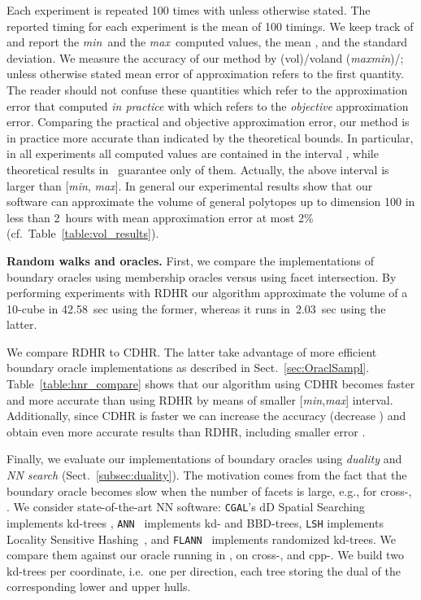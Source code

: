 \documentclass[11pt,a4paper]{article}
\def\vol{\mbox{vol}}
\def\vol{\mbox{vol}}
\def\Min{{\it min}}
\def\Max{{\it max}}
\begin{document}
Each experiment is repeated 100 times with  unless otherwise stated. 
The reported timing for each experiment is the mean of 100 timings. 
We keep track of and report the \Min\ and the \Max\ computed values,
the mean , and the standard deviation.  We measure the accuracy of our method by (\vol)/\vol and (\Max\Min)/; unless otherwise stated mean error of approximation refers to the first quantity. 
The reader should not confuse these quantities which refer to the approximation error that computed {\it in practice} with  which refers to the {\it objective} approximation error.
Comparing the practical and objective approximation error, our method is in practice more accurate than indicated by the theoretical bounds.
In particular, in all experiments all computed values are contained in the
interval ,
while theoretical results in~\cite{KannanLS97} guarantee only  of them.
Actually, the above interval is larger than [\Min, \Max].
In general our experimental results show that our software can approximate
the volume of general polytopes up to dimension 100 in less than 2~hours
with mean approximation error at most 2\% (cf.\ Table~\ref{table:vol_results}).

\vspace{.5em}
\textbf{Random walks and oracles.}
First, we compare the implementations of boundary oracles using membership oracles versus using facet intersection.  
By performing experiments with RDHR our algorithm
approximate the volume of a 10-cube in 42.58~sec using the former,
whereas it runs in~2.03~sec using the latter. 

We compare RDHR to CDHR. The latter take advantage of more efficient boundary oracle implementations as described in Sect.~\ref{sec:OraclSampl}.
Table~\ref{table:hnr_compare} shows that our algorithm using CDHR
becomes faster and more accurate than using RDHR by means of smaller
[\Min,\Max] interval.
Additionally, since CDHR is faster we can increase the accuracy
(decrease ) and obtain even more accurate results than RDHR,
including smaller error . 

Finally, we evaluate our implementations of boundary oracles using {\it duality} and {\it NN search} (Sect.~\ref{subsec:duality}). The motivation comes from the fact that the boundary oracle becomes slow when the number of facets is large, e.g., for cross-, . 
We consider state-of-the-art NN software:
{\tt CGAL}'s dD Spatial Searching implements kd-trees \cite{CGALKDtree},
{\tt ANN}~\cite{ANN97} implements kd- and BBD-trees,
{\tt LSH} implements Locality Sensitive Hashing~\cite{Andoni08},
and {\tt FLANN}~\cite{Muj11} implements randomized kd-trees.   
We compare them against our oracle running in , on
cross-,  and cpp-.
We build two kd-trees per coordinate, i.e.\ one per direction, each
tree storing the dual of the corresponding lower and upper hulls.
\end{document}
